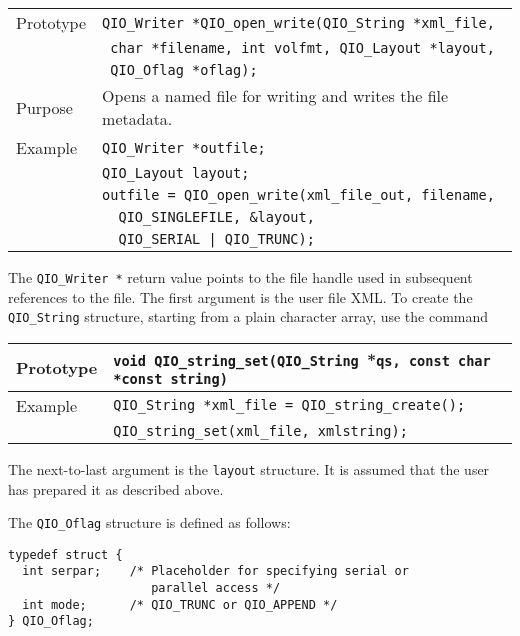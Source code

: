 \documentclass{article}
\newcommand{\QIOstring}{{\tt QIO\_String }}
\begin{document}
\begin{flushleft}
  \begin{tabular}{|l|l|}
  \hline
  Prototype      & \verb|QIO_Writer *QIO_open_write(|\QIOstring \verb|*xml_file,|\\
		 & \verb| char *filename, int volfmt, QIO_Layout *layout, | \\
                 & \verb| QIO_Oflag *oflag);| \\
  Purpose        & Opens a named file for writing and writes the file metadata. \\
\hline
  Example  & \verb|QIO_Writer *outfile;| \\
           & \verb|QIO_Layout layout;| \\
           & \verb|outfile = QIO_open_write(xml_file_out, filename, |\\
	   & \verb|  QIO_SINGLEFILE, &layout, |\\
           & \verb+  QIO_SERIAL | QIO_TRUNC); +\\
   \hline
 \end{tabular}
\end{flushleft}
%
The \verb|QIO_Writer *| return value points to the file handle used in
subsequent references to the file.  The first argument is the user
file XML.  To create the \verb|QIO_String| structure, starting from a
plain character array, use the command

\begin{flushleft}
  \begin{tabular}{|l|l|}
  \hline
  Prototype      & \verb|void QIO_string_set(|\QIOstring *\verb|qs, const char *const string)|\\
  \hline
   Example    & \QIOstring \verb|*xml_file = QIO_string_create();|\\
              & \verb|QIO_string_set(xml_file, xmlstring);|\\
   \hline
 \end{tabular}
\end{flushleft}

The next-to-last argument is the \verb|layout| structure.  It is
assumed that the user has prepared it as described above.

The \verb|QIO_Oflag| structure is defined as follows:
%
\begin{verbatim}
typedef struct {
  int serpar;    /* Placeholder for specifying serial or 
                    parallel access */
  int mode;      /* QIO_TRUNC or QIO_APPEND */
} QIO_Oflag;
\end{verbatim}
%
\end{document}
